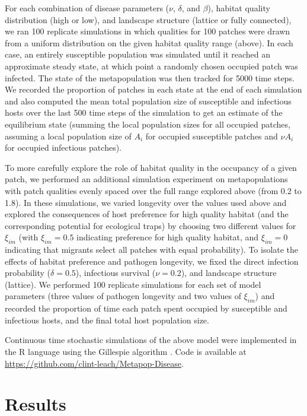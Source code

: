 \documentclass{article}
\begin{document}
For each combination of disease parameters ($\nu$, $\delta$, and $\beta$), habitat quality distribution (high or low), and landscape structure (lattice or fully connected), we ran 100 replicate simulations in which qualities for 100 patches were drawn from a uniform distribution on the given habitat quality range (above). In each case, an entirely susceptible population was simulated until it reached an approximate steady state, at which point a randomly chosen occupied patch was infected.  The state of the metapopulation was then tracked for 5000 time steps.  We recorded the proportion of patches in each state at the end of each simulation and also computed the mean total population size of susceptible and infectious hosts over the last 500 time steps of the simulation to get an estimate of the equilibrium state (summing the local population sizes for all occupied patches, assuming a local population size of $A_i$ for occupied susceptible patches and $\nu A_i$ for occupied infectious patches).    

To more carefully explore the role of habitat quality in the occupancy of a given patch, we performed an additional simulation experiment on metapopulations with patch qualities evenly spaced over the full range explored above (from 0.2 to 1.8).
In these simulations, we varied longevity over the values used above and explored the consequences of host preference for high quality habitat (and the corresponding potential for ecological traps) by choosing two different values for $\xi_{im}$ (with $\xi_{im} = 0.5$ indicating preference for high quality habitat, and  $\xi_{im} = 0$ indicating that migrants select all patches with equal probability).  
To isolate the effects of habitat preference and pathogen longevity, we fixed the direct infection probability ($\delta = 0.5$), infectious survival ($\nu = 0.2$), and landscape structure (lattice).
We performed 100 replicate simulations for each set of model parameters (three values of pathogen longevity and two values of $\xi_{im}$) and recorded the proportion of time each patch spent occupied by susceptible and infectious hosts, and the final total host population size.

Continuous time stochastic simulations of the above model were implemented in the R language \cite{R2014} using the Gillespie algorithm \cite{Gillespie1977}.  Code is available at \\
\url{https://github.com/clint-leach/Metapop-Disease}.

\section{Results}
\label{results}
\end{document}
